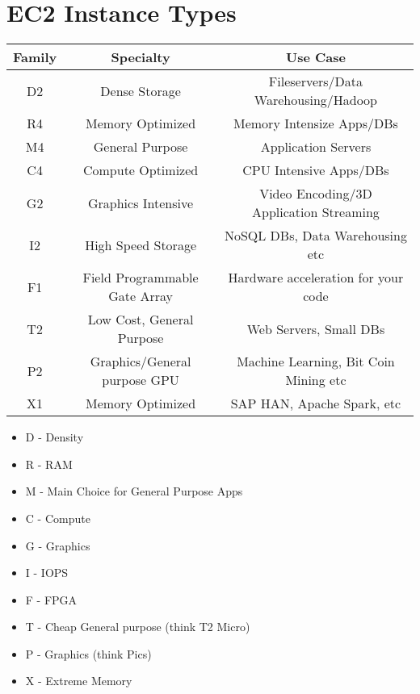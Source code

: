 \documentclass{article}
\begin{document}
\section{EC2 Instance Types}

\begin{center}
  \begin{tabular}{ c | c | c }
    \hline
    \textbf{Family} & \textbf{Specialty} & \textbf{Use Case} \\ \hline
     D2 & Dense Storage & Fileservers/Data Warehousing/Hadoop \\ \hline
     R4 & Memory Optimized & Memory Intensize Apps/DBs \\ \hline
     M4 & General Purpose & Application Servers \\ \hline
     C4 & Compute Optimized & CPU Intensive Apps/DBs \\ \hline
     G2 & Graphics Intensive & Video Encoding/3D Application Streaming \\ \hline
     I2 & High Speed Storage & NoSQL DBs, Data Warehousing etc \\ \hline
     F1 & Field Programmable Gate Array & Hardware acceleration for your code \\ \hline
     T2 & Low Cost, General Purpose & Web Servers, Small DBs \\ \hline
     P2 & Graphics/General purpose GPU & Machine Learning, Bit Coin Mining etc \\ \hline
     X1 & Memory Optimized & SAP HAN, Apache Spark, etc \\
    
    \hline
  \end{tabular}
\end{center}

\begin{itemize}
\item
D - Density

\item
R - RAM

\item
M - Main Choice for General Purpose Apps

\item
C - Compute

\item
G - Graphics

\item
I - IOPS

\item
F - FPGA

\item
T - Cheap General purpose (think T2 Micro)

\item
P - Graphics (think Pics)

\item
X - Extreme Memory

\end{itemize}
\end{document}
